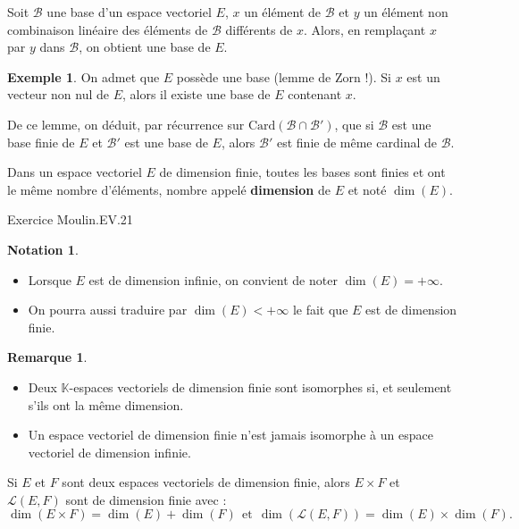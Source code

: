 \documentclass[french]{article}
\newcommand{\K}{\mathbb{K}}
\newcommand{\card}{\text{Card}}
\theoremstyle{plain}
\theoremstyle{definition}
\newtheorem*{ex}{Exemple}
\newtheorem*{rmq}{Remarque}
\newtheorem*{notation}{Notation}
\theoremstyle{remark}
\begin{document}
\begin{lem}%
	Soit $\mathcal{B}$ une base d'un espace vectoriel $E$, $x$ un élément de $\mathcal{B}$ et $y$ un élément non combinaison linéaire des éléments de $\mathcal{B}$ différents de $x$. Alors, en remplaçant $x$ par $y$ dans $\mathcal{B}$, on obtient une base de $E$.
\end{lem}

\begin{ex}
	On admet que $E$ possède une base (lemme de Zorn !). Si $x$ est un vecteur non nul de $E$, alors il existe une base de $E$ contenant $x$.
\end{ex}

De ce lemme, on déduit, par récurrence sur $\card(\mathcal{B}\cap\mathcal{B}')$, que si $\mathcal{B}$ est une base finie de $E$ et $\mathcal{B}'$ est une base de $E$, alors $\mathcal{B}'$ est finie de même cardinal de $\mathcal{B}$.

\begin{dfn}
	Dans un espace vectoriel $E$ de dimension finie, toutes les bases sont finies et ont le même nombre d'éléments, nombre appelé \textbf{dimension} de $E$ et noté $\dim(E)$.
\end{dfn}

Exercice Moulin.EV.21


\begin{notation}
	\begin{itemize}
	\item Lorsque $E$ est de dimension infinie, on convient de noter $\dim(E)=+\infty$.
	\item On pourra aussi traduire par $\dim(E)<+\infty$ le fait que $E$ est de dimension finie.
\end{itemize}
\end{notation}

\begin{rmq}
	\begin{itemize}
		\item Deux $\K$-espaces vectoriels de dimension finie sont isomorphes si, et seulement s'ils ont la même dimension.
		\item Un espace vectoriel de dimension finie n'est jamais isomorphe à un espace vectoriel de dimension infinie.
	\end{itemize}
\end{rmq}

\begin{prop}%
	Si $E$ et $F$ sont deux espaces vectoriels de dimension finie, alors $E\times F$ et $\mathcal{L}(E,F)$ sont de dimension finie avec : $$\dim(E\times F)=\dim(E)+\dim(F)\ \ \text{et}\ \ \dim\left(\mathcal{L}(E,F)\right)=\dim(E)\times\dim(F).$$
\end{prop}
\end{document}
